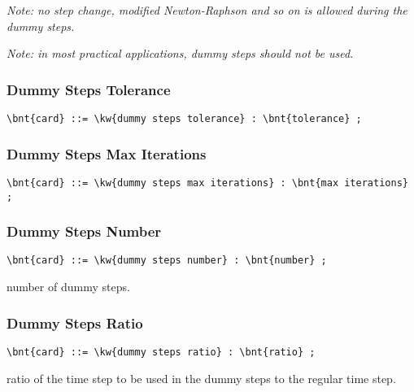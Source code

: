\emph{Note: no step change, modified Newton-Raphson and so on is allowed
    during the dummy steps.}

\emph{Note: in most practical applications, dummy steps should not be used.}


\subsubsection{Dummy Steps Tolerance}
\begin{Verbatim}[commandchars=\\\{\}]
    \bnt{card} ::= \kw{dummy steps tolerance} : \bnt{tolerance} ;
\end{Verbatim}

\subsubsection{Dummy Steps Max Iterations}
\begin{Verbatim}[commandchars=\\\{\}]
    \bnt{card} ::= \kw{dummy steps max iterations} : \bnt{max iterations} ;
\end{Verbatim}    

\subsubsection{Dummy Steps Number}
\begin{Verbatim}[commandchars=\\\{\}]
    \bnt{card} ::= \kw{dummy steps number} : \bnt{number} ;
\end{Verbatim}
number of dummy steps.

\subsubsection{Dummy Steps Ratio}
\begin{Verbatim}[commandchars=\\\{\}]
    \bnt{card} ::= \kw{dummy steps ratio} : \bnt{ratio} ;
\end{Verbatim}
ratio of the time step to be used in the dummy steps to the regular
time step.

